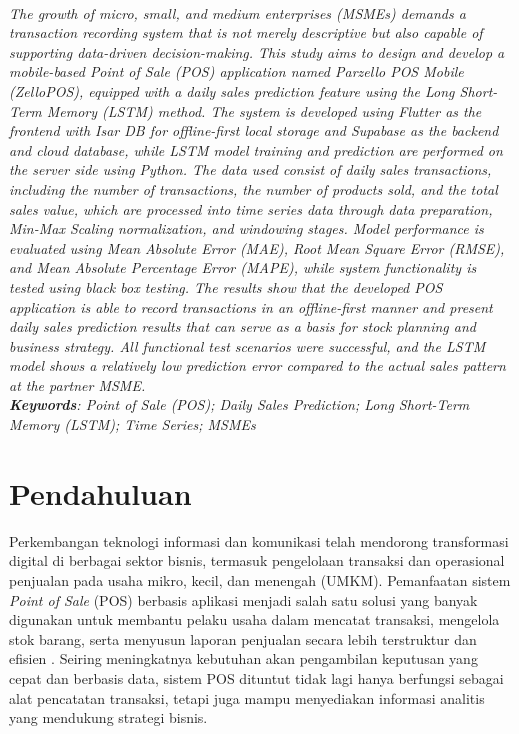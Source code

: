 \documentclass[a4paper,10pt,onecolumn]{article}
\begin{document}
\\[0.2cm]
{\fontsize{9pt}{11pt}\selectfont\itshape
The growth of micro, small, and medium enterprises (MSMEs) demands a transaction recording system that is not merely descriptive but also capable of supporting data-driven decision-making. This study aims to design and develop a mobile-based Point of Sale (POS) application named Parzello POS Mobile (ZelloPOS), equipped with a daily sales prediction feature using the Long Short-Term Memory (LSTM) method. The system is developed using Flutter as the frontend with Isar DB for offline-first local storage and Supabase as the backend and cloud database, while LSTM model training and prediction are performed on the server side using Python. The data used consist of daily sales transactions, including the number of transactions, the number of products sold, and the total sales value, which are processed into time series data through data preparation, Min-Max Scaling normalization, and windowing stages. Model performance is evaluated using Mean Absolute Error (MAE), Root Mean Square Error (RMSE), and Mean Absolute Percentage Error (MAPE), while system functionality is tested using black box testing. The results show that the developed POS application is able to record transactions in an offline-first manner and present daily sales prediction results that can serve as a basis for stock planning and business strategy. All functional test scenarios were successful, and the LSTM model shows a relatively low prediction error compared to the actual sales pattern at the partner MSME.\\[0.3cm]
\noindent\textbf{Keywords}: Point of Sale (POS); Daily Sales Prediction; Long Short-Term Memory (LSTM); Time Series; MSMEs
}

\vspace{0.6cm}

\section{Pendahuluan}

Perkembangan teknologi informasi dan komunikasi telah mendorong transformasi digital di berbagai sektor bisnis, termasuk pengelolaan transaksi dan operasional penjualan pada usaha mikro, kecil, dan menengah (UMKM). Pemanfaatan sistem \textit{Point of Sale} (POS) berbasis aplikasi menjadi salah satu solusi yang banyak digunakan untuk membantu pelaku usaha dalam mencatat transaksi, mengelola stok barang, serta menyusun laporan penjualan secara lebih terstruktur dan efisien \cite{Wijaya2022}. Seiring meningkatnya kebutuhan akan pengambilan keputusan yang cepat dan berbasis data, sistem POS dituntut tidak lagi hanya berfungsi sebagai alat pencatatan transaksi, tetapi juga mampu menyediakan informasi analitis yang mendukung strategi bisnis.
\end{document}

